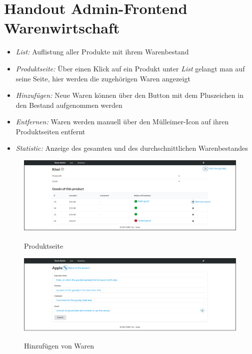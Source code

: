 







\section*{Handout Admin-Frontend Warenwirtschaft}

\begin{itemize}
	\item \textit{List:} Auflistung aller Produkte mit ihrem Warenbestand
	\item \textit{Produktseite:} Über einen Klick auf ein Produkt unter \textit{List} gelangt man auf seine Seite, hier werden die zugehörigen Waren angezeigt
	\item \textit{Hinzufügen:} Neue Waren können über den Button mit dem Pluszeichen in den Bestand aufgenommen werden
	\item \textit{Entfernen:} Waren werden manuell über den Mülleimer-Icon auf ihren Produktseiten entfernt
	\item \textit{Statistic:} Anzeige des gesamten und des durchschnittlichen Warenbestandes
	
\end{itemize}

\begin{figure}[H]
	\centering
	{\includegraphics[width=1 \textwidth]{./product_handout.png}}
	\caption{Produktseite}
\end{figure}

\begin{figure}[H]
	\centering
	{\includegraphics[width=1 \textwidth]{./add_handout.png}}
	\caption{Hinzufügen von Waren}
\end{figure}

